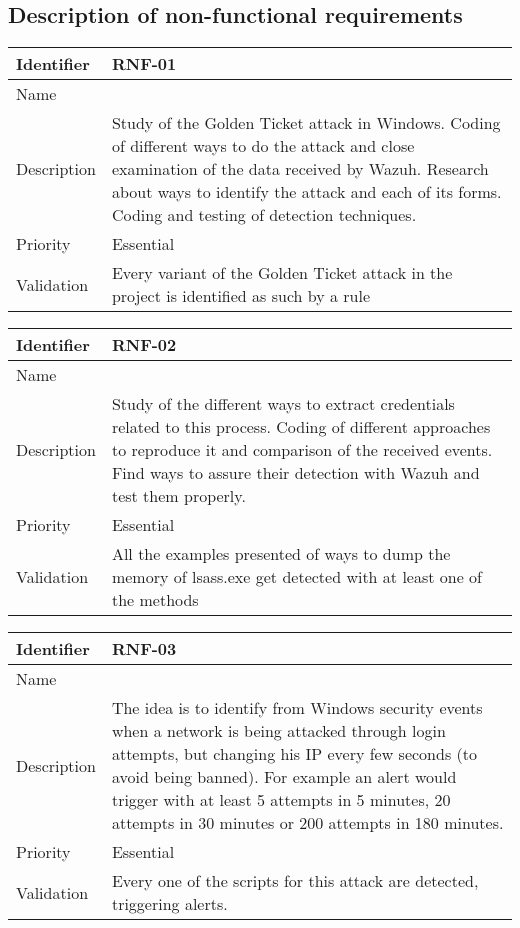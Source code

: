 \subsection{Description of non-functional requirements}
\begin{table}[H]
	\begin{tabularx}{\textwidth}{|l|X|}
		\hline
		\rowcolor{gray!30}
		Identifier & \textbf{RNF-01} \\ \hline
		Name & \RNFuno \\ \hline
		Description & Study of the Golden Ticket attack in Windows. Coding of different ways to do the attack and close examination of the data received by Wazuh. Research about ways to identify the attack and each of its forms. Coding and testing of detection techniques. \\ \hline
		Priority & Essential \\ \hline
		Validation & Every variant of the Golden Ticket attack in the project is identified as such by a rule \\ \hline
	\end{tabularx}
\end{table}
\begin{table}[H]
	\begin{tabularx}{\textwidth}{|l|X|}
		\hline
		\rowcolor{gray!30}
		Identifier & \textbf{RNF-02} \\ \hline
		Name & \RNFdos \\ \hline
		Description & Study of the different ways to extract credentials related to this process. Coding of different approaches to reproduce it and comparison of the received events. Find ways to assure their detection with Wazuh and test them properly. \\ \hline
		Priority & Essential \\ \hline
		Validation & All the examples presented of ways to dump the memory of lsass.exe get detected with at least one of the methods \\ \hline
	\end{tabularx}
\end{table}
\begin{table}[H]
	\begin{tabularx}{\textwidth}{|l|X|}
		\hline
		\rowcolor{gray!30}
		Identifier & \textbf{RNF-03} \\ \hline
		Name & \RNFtres \\ \hline
		Description & The idea is to identify from Windows security events when a network is being attacked through login attempts, but changing his IP every few seconds (to avoid being banned). For example an alert would trigger with at least 5 attempts in 5 minutes, 20 attempts in 30 minutes or 200 attempts in 180 minutes. \\ \hline
		Priority & Essential \\ \hline
		Validation & Every one of the scripts for this attack are detected, triggering alerts. \\ \hline
	\end{tabularx}
\end{table}
